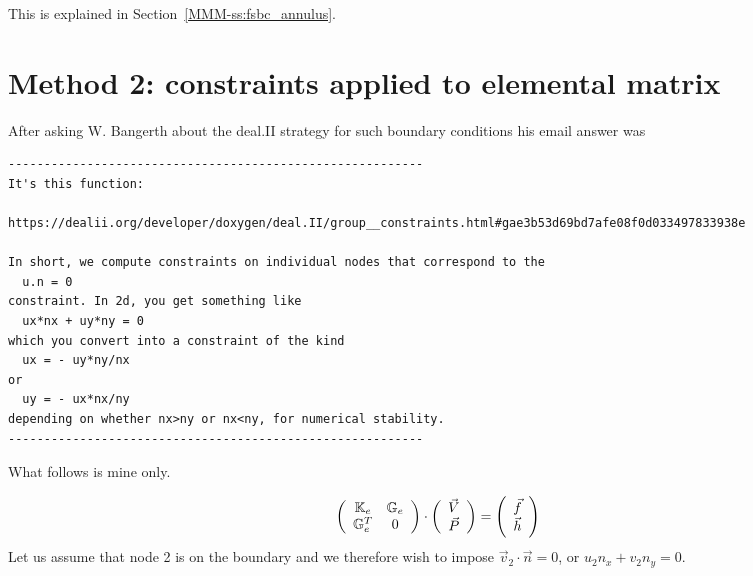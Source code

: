 This is explained in Section~\ref{MMM-ss:fsbc_annulus}.

\section*{Method 2: constraints applied to elemental matrix}

After asking W. Bangerth about the deal.II strategy for such boundary conditions 
his email answer was

\begin{verbatim}
----------------------------------------------------------
It's this function:

https://dealii.org/developer/doxygen/deal.II/group__constraints.html#gae3b53d69bd7afe08f0d033497833938e

In short, we compute constraints on individual nodes that correspond to the
  u.n = 0
constraint. In 2d, you get something like
  ux*nx + uy*ny = 0
which you convert into a constraint of the kind
  ux = - uy*ny/nx
or
  uy = - ux*nx/ny
depending on whether nx>ny or nx<ny, for numerical stability.
----------------------------------------------------------
\end{verbatim}

What follows is mine only.



\[
\left(
\begin{array}{cc}
{\mathbb{K}}_e & {\mathbb{G}}_e \\
{\mathbb{G}}_e^T & 0
\end{array}
\right)
\cdot
\left(
\begin{array}{c}
\vec{V} \\
\vec{P}
\end{array}
\right)
=\left(
\begin{array}{c}
\vec{f} \\ \vec{h}
\end{array}
\right)
\]
Let us assume that node 2 is on the boundary and we therefore wish to 
impose $\vec{v}_2\cdot \vec{n}=0$, or $u_2 n_x + v_2 n_y =0$.

